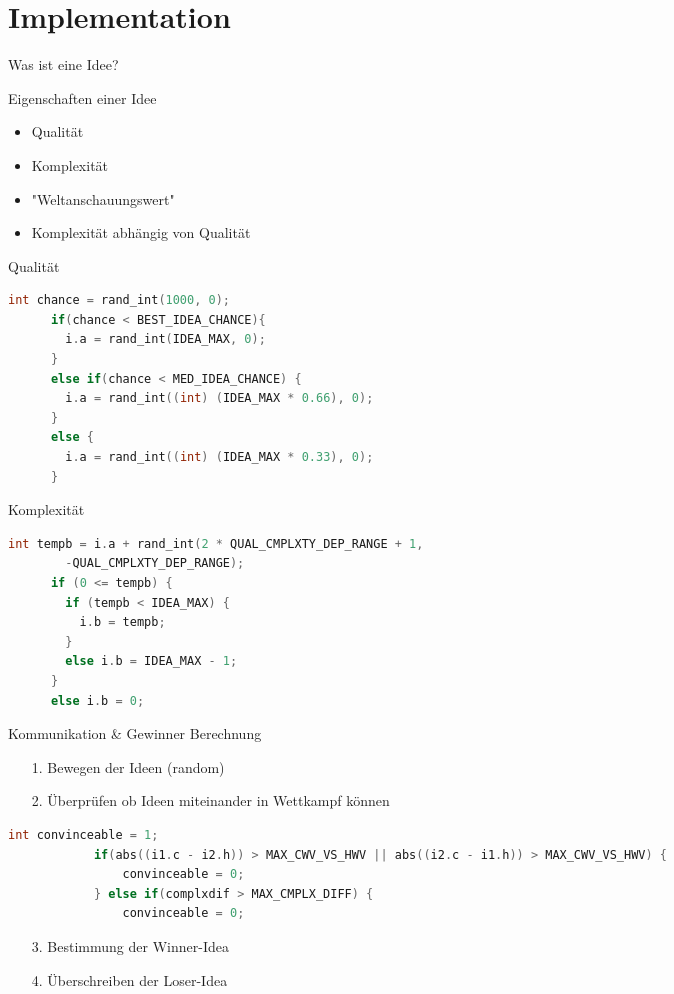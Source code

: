 \section{Implementation}

\begin{frame}{Was ist eine Idee?}
	\begin{block}{Eigenschaften einer Idee}
		\begin{itemize}
			\item Qualität
			\item Komplexität
			\item "Weltanschauungswert"
			\item Komplexität abhängig von Qualität
		\end{itemize}
	\end{block}
\end{frame}

\begin{frame}[fragile]{Qualität}
	\begin{lstlisting}[language=C,basicstyle=\small,breaklines=true,keywordstyle=\color{black}]
	 int chance = rand_int(1000, 0);
	  if(chance < BEST_IDEA_CHANCE){
	    i.a = rand_int(IDEA_MAX, 0);
	  }
	  else if(chance < MED_IDEA_CHANCE) {
	    i.a = rand_int((int) (IDEA_MAX * 0.66), 0);
	  }
	  else {
	    i.a = rand_int((int) (IDEA_MAX * 0.33), 0);
	  }
	  \end{lstlisting}
\end{frame}

\begin{frame}[fragile]{Komplexität}
	\begin{lstlisting}[language=C,basicstyle=\small,breaklines=true,keywordstyle=\color{black}]
	int tempb = i.a + rand_int(2 * QUAL_CMPLXTY_DEP_RANGE + 1, 
	    -QUAL_CMPLXTY_DEP_RANGE);
	  if (0 <= tempb) {
	    if (tempb < IDEA_MAX) {
	      i.b = tempb;
	    } 
	    else i.b = IDEA_MAX - 1;
	  } 
	  else i.b = 0;
	\end{lstlisting}
\end{frame}

\begin{frame}[fragile]{Kommunikation \& Gewinner Berechnung}
	\begin{itemize}
		\item[1.] Bewegen der Ideen (random)
		\item[2.] Überprüfen ob Ideen miteinander in Wettkampf können 
	\end{itemize}
		\begin{lstlisting}[language=C,basicstyle=\small,breaklines=true,keywordstyle=\color{black}]
		    int convinceable = 1;
		    if(abs((i1.c - i2.h)) > MAX_CWV_VS_HWV || abs((i2.c - i1.h)) > MAX_CWV_VS_HWV) {
	    	    convinceable = 0;
	  	    } else if(complxdif > MAX_CMPLX_DIFF) {
	    	    convinceable = 0;
		\end{lstlisting}	
	\begin{itemize}
		\item[3.] Bestimmung der Winner-Idea 
		\item[4.] Überschreiben der Loser-Idea
	\end{itemize}
\end{frame}


